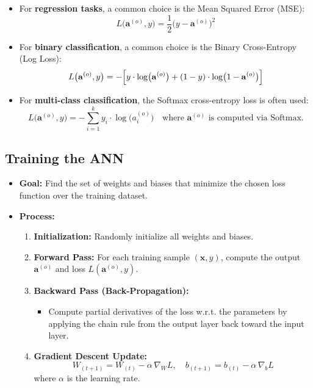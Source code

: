\documentclass{article}
\begin{document}
\begin{itemize}
    \item For \textbf{regression tasks}, a common choice is the Mean Squared Error (MSE):
    \[
    L\bigl(\mathbf{a}^{(o)}, y\bigr) = \frac{1}{2}\bigl(y - \mathbf{a}^{(o)}\bigr)^2
    \]
    \item For \textbf{binary classification}, a common choice is the Binary Cross-Entropy (Log Loss):
    \[
    L\bigl(\mathbf{a}^{(o)}, y\bigr)
    = -\Bigl[y \cdot \log\bigl(\mathbf{a}^{(o)}\bigr) + (1-y)\cdot \log\bigl(1 - \mathbf{a}^{(o)}\bigr)\Bigr]
    \]
    \item For \textbf{multi-class classification}, the Softmax cross-entropy loss is often used:
    \[
    L\bigl(\mathbf{a}^{(o)}, y\bigr)
    = -\sum_{i=1}^{k} y_i \cdot \log\bigl(a_i^{(o)}\bigr)
    \quad \text{where } \mathbf{a}^{(o)} \text{ is computed via Softmax.}
    \]
\end{itemize}

\subsection{Training the ANN}

\begin{itemize}
    \item \textbf{Goal:} Find the set of weights and biases that minimize the chosen loss function over the training dataset.
    \item \textbf{Process:}
    \begin{enumerate}
        \item \textbf{Initialization:} Randomly initialize all weights and biases.
        \item \textbf{Forward Pass:} For each training sample $(\mathbf{x}, y)$, compute the output $\mathbf{a}^{(o)}$ and loss $L(\mathbf{a}^{(o)}, y)$.
        \item \textbf{Backward Pass (Back-Propagation):} 
        \begin{itemize}
            \item Compute partial derivatives of the loss w.r.t. the parameters by applying the chain rule from the output layer back toward the input layer.
        \end{itemize}
        \item \textbf{Gradient Descent Update:}
        \[
        W_{(t+1)} = W_{(t)} - \alpha \, \nabla_W L, 
        \quad
        b_{(t+1)} = b_{(t)} - \alpha \, \nabla_b L
        \]
        where $\alpha$ is the learning rate.
    \end{enumerate}
\end{itemize}
\end{document}

